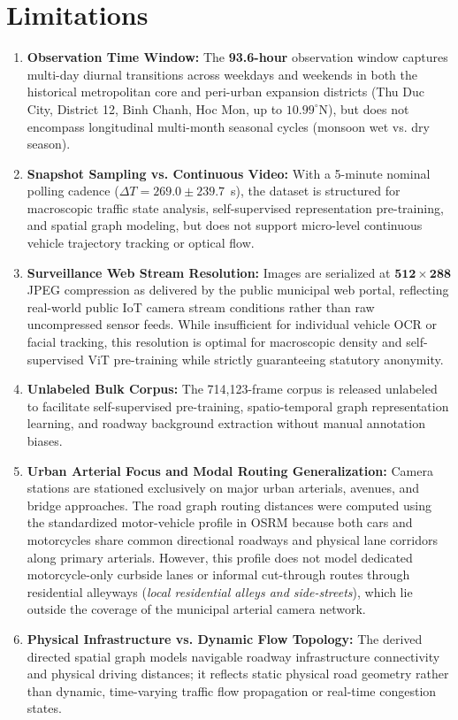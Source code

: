 \documentclass[preprint,12pt]{elsarticle}
\begin{document}
\section{Limitations}
\begin{enumerate}
    \item \textbf{Observation Time Window:} The \textbf{93.6-hour} observation window captures multi-day diurnal transitions across weekdays and weekends in both the historical metropolitan core and peri-urban expansion districts (Thu Duc City, District 12, Binh Chanh, Hoc Mon, up to $10.99^\circ\text{N}$), but does not encompass longitudinal multi-month seasonal cycles (monsoon wet vs. dry season).
    \item \textbf{Snapshot Sampling vs. Continuous Video:} With a 5-minute nominal polling cadence ($\Delta T = 269.0 \pm 239.7$~s), the dataset is structured for macroscopic traffic state analysis, self-supervised representation pre-training, and spatial graph modeling, but does not support micro-level continuous vehicle trajectory tracking or optical flow.
    \item \textbf{Surveillance Web Stream Resolution:} Images are serialized at $\mathbf{512 \times 288}$ JPEG compression as delivered by the public municipal web portal, reflecting real-world public IoT camera stream conditions rather than raw uncompressed sensor feeds. While insufficient for individual vehicle OCR or facial tracking, this resolution is optimal for macroscopic density and self-supervised ViT pre-training while strictly guaranteeing statutory anonymity.
    \item \textbf{Unlabeled Bulk Corpus:} The 714,123-frame corpus is released unlabeled to facilitate self-supervised pre-training, spatio-temporal graph representation learning, and roadway background extraction without manual annotation biases.
    \item \textbf{Urban Arterial Focus and Modal Routing Generalization:} Camera stations are stationed exclusively on major urban arterials, avenues, and bridge approaches. The road graph routing distances were computed using the standardized motor-vehicle profile in OSRM because both cars and motorcycles share common directional roadways and physical lane corridors along primary arterials. However, this profile does not model dedicated motorcycle-only curbside lanes or informal cut-through routes through residential alleyways (\textit{local residential alleys and side-streets}), which lie outside the coverage of the municipal arterial camera network.
    \item \textbf{Physical Infrastructure vs. Dynamic Flow Topology:} The derived directed spatial graph models navigable roadway infrastructure connectivity and physical driving distances; it reflects static physical road geometry rather than dynamic, time-varying traffic flow propagation or real-time congestion states.
\end{enumerate}
\end{document}
